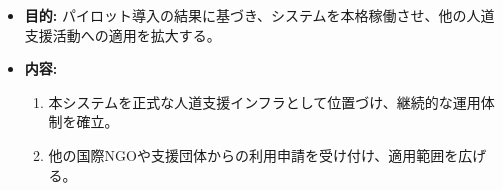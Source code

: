 \documentclass[
  a4paper,
  ja=standard,
  xelatex]{bxjsarticle}
\begin{document}
\begin{itemize}
\item
  \textbf{目的:}
  パイロット導入の結果に基づき、システムを本格稼働させ、他の人道支援活動への適用を拡大する。
\item
  \textbf{内容:}

  \begin{enumerate}
  \def\labelenumi{\arabic{enumi}.}
  \item
    本システムを正式な人道支援インフラとして位置づけ、継続的な運用体制を確立。
  \item
    他の国際NGOや支援団体からの利用申請を受け付け、適用範囲を広げる。
  \end{enumerate}
\end{itemize}
\end{document}
